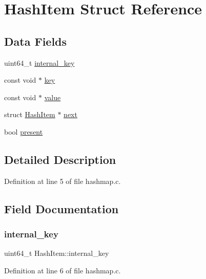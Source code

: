 \hypertarget{structHashItem}{}\section{Hash\+Item Struct Reference}
\label{structHashItem}
\subsection*{Data Fields}
\begin{DoxyCompactItemize}
\item 
uint64\+\_\+t \mbox{\hyperlink{structHashItem_ab70c6466a57bc6f281a7943350a74329}{internal\+\_\+key}}
\item 
const void $\ast$ \mbox{\hyperlink{structHashItem_a0bd79196ef574b956a40b009950a1ef4}{key}}
\item 
const void $\ast$ \mbox{\hyperlink{structHashItem_abb041948b3408787c4d46d9afd8fb793}{value}}
\item 
struct \mbox{\hyperlink{structHashItem}{Hash\+Item}} $\ast$ \mbox{\hyperlink{structHashItem_a623917e154bb2a360da5cbc9d3329171}{next}}
\item 
bool \mbox{\hyperlink{structHashItem_a7fe892239fc6fb4cef7e2f2cf1581b1f}{present}}
\end{DoxyCompactItemize}


\subsection{Detailed Description}


Definition at line 5 of file hashmap.\+c.



\subsection{Field Documentation}
\mbox{\label{structHashItem_ab70c6466a57bc6f281a7943350a74329}} 
\subsubsection{\texorpdfstring{internal\+\_\+key}{internal\_key}}
{\footnotesize\ttfamily uint64\+\_\+t Hash\+Item\+::internal\+\_\+key}



Definition at line 6 of file hashmap.\+c.



